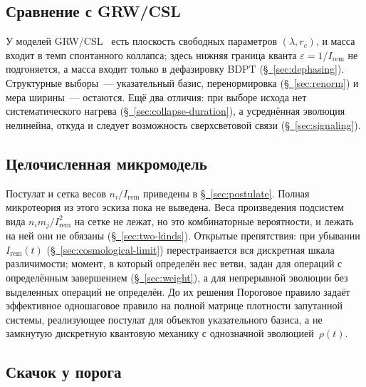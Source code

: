 \documentclass[11pt,a4paper]{article}
\newcommand{\Ost}{I_{\mathrm{rem}}}
\newcommand{\CollapseRule}{Пороговое правило}
\begin{document}
\subsection{Сравнение с GRW/CSL}

У моделей GRW/CSL~\cite{ghirardi1986,ghirardi1990,bassi2013} есть плоскость свободных параметров $(\lambda,r_c)$, и масса входит в темп спонтанного коллапса; здесь нижняя граница кванта $\varepsilon=1/\Ost$ не подгоняется, а масса входит только в дефазировку BDPT (\hyperref[sec:dephasing]{\S~\ref*{sec:dephasing}}). Структурные выборы~--- указательный базис, перенормировка (\hyperref[sec:renorm]{\S~\ref*{sec:renorm}}) и мера ширины~--- остаются. Ещё два отличия: при выборе исхода нет систематического нагрева (\hyperref[sec:collapse-duration]{\S~\ref*{sec:collapse-duration}}), а усреднённая эволюция нелинейна, откуда и следует возможность сверхсветовой связи (\hyperref[sec:signaling]{\S~\ref*{sec:signaling}}).

\subsection{Целочисленная микромодель}
\label{sec:micromodel}

Постулат и сетка весов $n_i/\Ost$ приведены в \hyperref[sec:postulate]{\S~\ref*{sec:postulate}}. Полная микротеория из этого эскиза пока не выведена. Веса произведения подсистем вида $n_i m_j/\Ost^2$ на сетке не лежат, но это комбинаторные вероятности, и лежать на ней они не обязаны (\hyperref[sec:two-kinds]{\S~\ref*{sec:two-kinds}}). Открытые препятствия: при убывании $\Ost(t)$ (\hyperref[sec:cosmological-limit]{\S~\ref*{sec:cosmological-limit}}) перестраивается вся дискретная шкала различимости; момент, в который определён вес ветви, задан для операций с определённым завершением (\hyperref[sec:weight]{\S~\ref*{sec:weight}}), а для непрерывной эволюции без выделенных операций не определён. До их решения \CollapseRule{} задаёт эффективное одношаговое правило на полной матрице плотности запутанной системы, реализующее постулат для объектов указательного базиса, а не замкнутую дискретную квантовую механику с однозначной эволюцией~$\rho(t)$.

\subsection{Скачок у порога}
\end{document}
